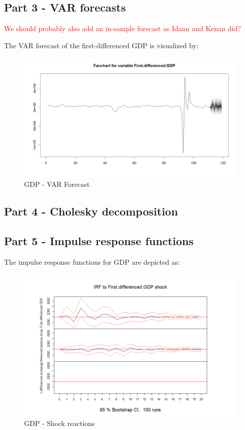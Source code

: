 \documentclass[
]{article}
\begin{document}
\subsection*{Part 3 - VAR forecasts}

\textcolor{red}{We should probably also add an in-sample forecast as Idann and Kenan did?}

The VAR forecast of the first-differenced GDP is visualized by:

\begin{figure}

{\centering \includegraphics[width=0.8\linewidth]{../results/VAR_forecast2} 

}

\caption{GDP - VAR Forecast}\label{fig:unnamed-chunk-23}
\end{figure}

\subsection*{Part 4 - Cholesky decomposition}

\subsection*{Part 5 - Impulse response functions}

The impulse response functions for GDP are depicted as:

\begin{figure}

{\centering \includegraphics[width=0.8\linewidth]{../results/IRF_plots/IRF_to_First.differenced.GDP} 

}

\caption{GDP - Shock reactions}\label{fig:unnamed-chunk-24}
\end{figure}
\end{document}
